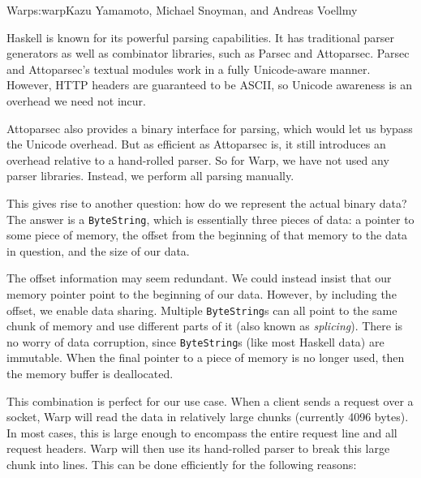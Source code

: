 \begin{aosachapter}{Warp}{s:warp}{Kazu Yamamoto, Michael Snoyman, and Andreas Voellmy}

\label{sec.warp.writingparser}

Haskell is known for its powerful parsing capabilities. It has
traditional parser generators as well as combinator libraries, such as
Parsec and Attoparsec. Parsec and Attoparsec's textual modules work in a
fully Unicode-aware manner. However, HTTP headers are guaranteed to be
ASCII, so Unicode awareness is an overhead we need not incur.

Attoparsec also provides a binary interface for parsing, which would let
us bypass the Unicode overhead. But as efficient as Attoparsec is, it
still introduces an overhead relative to a hand-rolled parser. So for
Warp, we have not used any parser libraries. Instead, we perform all
parsing manually.

This gives rise to another question: how do we represent the actual
binary data? The answer is a \texttt{ByteString}, which is essentially
three pieces of data: a pointer to some piece of memory, the offset from
the beginning of that memory to the data in question, and the size of
our data.

The offset information may seem redundant. We could instead insist that
our memory pointer point to the beginning of our data. However, by
including the offset, we enable data sharing. Multiple
\texttt{ByteString}s can all point to the same chunk of memory and use
different parts of it (also known as \emph{splicing}). There is no worry
of data corruption, since \texttt{ByteString}s (like most Haskell data)
are immutable. When the final pointer to a piece of memory is no longer
used, then the memory buffer is deallocated.

This combination is perfect for our use case. When a client sends a
request over a socket, Warp will read the data in relatively large
chunks (currently 4096 bytes). In most cases, this is large enough to
encompass the entire request line and all request headers. Warp will
then use its hand-rolled parser to break this large chunk into lines.
This can be done efficiently for the following reasons:


\end{aosachapter}
